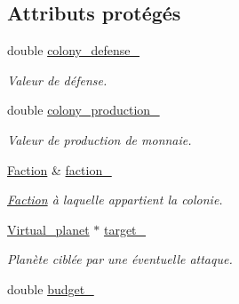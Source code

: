 \subsection*{Attributs protégés}
\begin{DoxyCompactItemize}
\item 
\hypertarget{classColonized__planet_ac645c006479bc9722dc3df7de53613bb}{double \hyperlink{classColonized__planet_ac645c006479bc9722dc3df7de53613bb}{colony\-\_\-defense\-\_\-}}\label{classColonized__planet_ac645c006479bc9722dc3df7de53613bb}

\begin{DoxyCompactList}\small\item\em Valeur de défense. \end{DoxyCompactList}\item 
\hypertarget{classColonized__planet_affcfbff793cae417ce77ab90b4868ef8}{double \hyperlink{classColonized__planet_affcfbff793cae417ce77ab90b4868ef8}{colony\-\_\-production\-\_\-}}\label{classColonized__planet_affcfbff793cae417ce77ab90b4868ef8}

\begin{DoxyCompactList}\small\item\em Valeur de production de monnaie. \end{DoxyCompactList}\item 
\hypertarget{classColonized__planet_a0f362a09eaf2da16c442decbdaf57d21}{\hyperlink{classFaction}{Faction} \& \hyperlink{classColonized__planet_a0f362a09eaf2da16c442decbdaf57d21}{faction\-\_\-}}\label{classColonized__planet_a0f362a09eaf2da16c442decbdaf57d21}

\begin{DoxyCompactList}\small\item\em \hyperlink{classFaction}{Faction} à laquelle appartient la colonie. \end{DoxyCompactList}\item 
\hypertarget{classColonized__planet_af24d15905b14b8a1af9c202791dffe5f}{\hyperlink{classVirtual__planet}{Virtual\-\_\-planet} $\ast$ \hyperlink{classColonized__planet_af24d15905b14b8a1af9c202791dffe5f}{target\-\_\-}}\label{classColonized__planet_af24d15905b14b8a1af9c202791dffe5f}

\begin{DoxyCompactList}\small\item\em Planète ciblée par une éventuelle attaque. \end{DoxyCompactList}\item 
\hypertarget{classColonized__planet_a9ba08dc04733fcef48b1107ec8b6af84}{double \hyperlink{classColonized__planet_a9ba08dc04733fcef48b1107ec8b6af84}{budget\-\_\-}}\label{classColonized__planet_a9ba08dc04733fcef48b1107ec8b6af84}


\end{DoxyCompactItemize}
